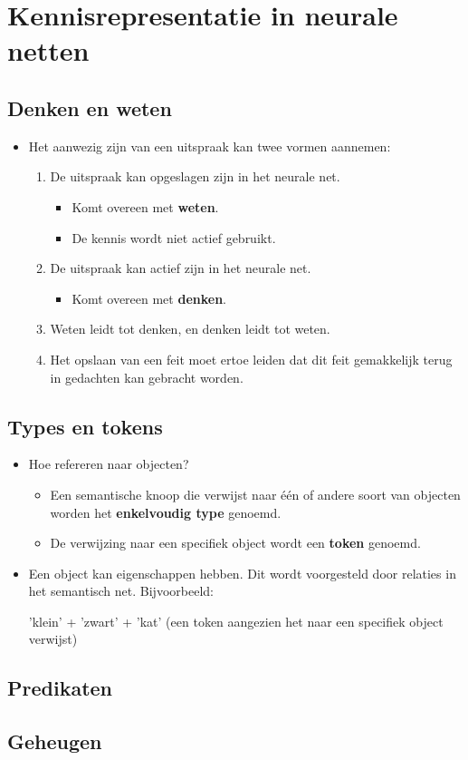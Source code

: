 \chapter{Kennisrepresentatie in neurale netten}

\section{Denken en weten}
\begin{itemize}
    \item Het aanwezig zijn van een uitspraak kan twee vormen aannemen:
    \begin{enumerate}
        \item De uitspraak kan opgeslagen zijn in het neurale net.
        \begin{itemize}
            \item Komt overeen met \textbf{weten}.
            \item De kennis wordt niet actief gebruikt.
        \end{itemize}
        \item De uitspraak kan actief zijn in het neurale net.
        \begin{itemize}
            \item Komt overeen met \textbf{denken}.
        \end{itemize}
        \item Weten leidt tot denken, en denken leidt tot weten.
        \item Het opslaan van een feit moet ertoe leiden dat dit feit gemakkelijk terug in gedachten kan gebracht worden.
    \end{enumerate}
\end{itemize}

\section{Types en tokens}
\begin{itemize}
    \item Hoe refereren naar objecten?
    \begin{itemize}
        \item Een semantische knoop die verwijst naar één of andere soort van objecten worden het \textbf{enkelvoudig type} genoemd.
        \item De verwijzing naar een specifiek object wordt een \textbf{token} genoemd.

        

    \end{itemize}
    \item Een object kan eigenschappen hebben. Dit wordt voorgesteld door relaties in het semantisch net. Bijvoorbeeld:
    
    'klein' + 'zwart' + 'kat' (een token aangezien het naar een specifiek object verwijst)
\end{itemize}
\section{Predikaten}

\section{Geheugen}